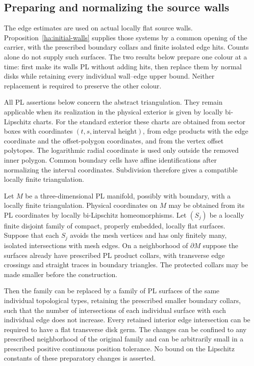 \subsection{Preparing and normalizing the source walls}
\label{wl:normalization-subsection}

The edge estimates are used on actual locally flat source walls.
Proposition~\ref{ha:initial-walls} supplies those systems by a common
opening of the carrier, with the prescribed boundary collars and finite
isolated edge hits.  Counts alone do not supply such surfaces.  The two
results below prepare one colour at a time: first make its walls PL
without adding hits, then replace them by normal disks while retaining
every individual wall--edge upper bound.  Neither replacement is
required to preserve the other colour.

All PL assertions below concern the abstract triangulation.  They remain
applicable when its realization in the physical exterior is given by locally
bi-Lipschitz charts.  For the standard exterior these charts are obtained from
sector boxes with coordinates $(t,s,\text{interval height})$, from edge products
with the edge coordinate and the offset-polygon coordinates, and from the
vertex offset polytopes.  The logarithmic radial coordinate is used only outside
the removed inner polygon.  Common boundary cells have affine identifications
after normalizing the interval coordinates.  Subdivision therefore gives a
compatible locally finite triangulation.

\begin{lemma}\label{wl:relative-pl}
Let $M$ be a three-dimensional PL manifold, possibly with boundary, with a
locally finite triangulation.  Physical coordinates on $M$ may be obtained
from its PL coordinates by locally bi-Lipschitz homeomorphisms.  Let
$(S_j)$ be a locally finite disjoint family of compact, properly embedded,
locally flat surfaces.  Suppose that each $S_j$ avoids the mesh vertices
and has only finitely many, isolated intersections with mesh edges.
On a neighborhood of $\partial M$ suppose the surfaces already have
prescribed PL product collars, with transverse edge crossings and straight
traces in boundary triangles.  The protected collars may be made smaller
before the construction.

Then the family can be replaced by a family of PL surfaces of the same
individual topological types, retaining the prescribed smaller boundary
collars, such that the number of intersections of each individual surface
with each individual edge does not increase.  Every retained interior
edge intersection can be required to have a flat transverse disk germ.
The changes can be confined to any prescribed neighborhood of the original
family and can be arbitrarily small in a prescribed positive continuous
position tolerance.  No bound on the Lipschitz constants of these
preparatory changes is asserted.
\end{lemma}

